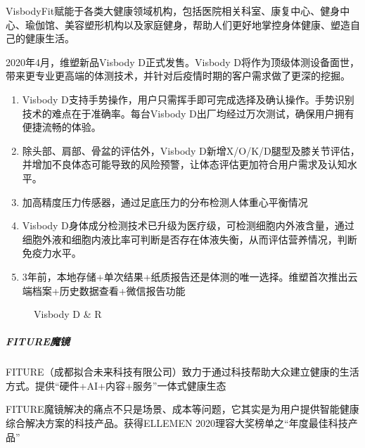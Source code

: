 \documentclass[letterpaper,11pt,english]{sphinxmanual}
\begin{document}
VisbodyFit赋能于各类大健康领域机构，包括医院相关科室、康复中心、健身中心、瑜伽馆、美容塑形机构以及家庭健身，帮助人们更好地掌控身体健康、塑造自己的健康生活。

2020年4月，维塑新品Visbody D正式发售。Visbody
D将作为顶级体测设备面世，带来更专业更高端的体测技术，并针对后疫情时期的客户需求做了更深的挖掘。%
\begin{footnote}[251]\sphinxAtStartFootnote
{}
%
\end{footnote}
\begin{enumerate}
%
\item {} 
Visbody
D支持手势操作，用户只需挥手即可完成选择及确认操作。手势识别技术的难点在于准确率。每台Visbody
D出厂均经过万次测试，确保用户拥有便捷流畅的体验。

\item {} 
除头部、肩部、骨盆的评估外，Visbody
D新增X/O/K/D腿型及膝关节评估，并增加不良体态可能导致的风险预警，让体态评估更加符合用户需求及认知水平。

\item {} 
加高精度压力传感器，通过足底压力的分布检测人体重心平衡情况

\item {} 
Visbody
D身体成分检测技术已升级为医疗级，可检测细胞内外液含量，通过细胞外液和细胞内液比率可判断是否存在体液失衡，从而评估营养情况，判断免疫力水平。

\item {} 
3年前，本地存储+单次结果+纸质报告还是体测的唯一选择。维塑首次推出云端档案+历史数据查看+微信报告功能

\end{enumerate}

\begin{figure}[H]
\centering
\capstart

\noindent{}
\caption{Visbody D \& R}\label{\detokenize{chapter_project/AI_fit:id17}}\end{figure}


\subparagraph{FITURE魔镜}
\label{\detokenize{chapter_project/AI_fit:fiture}}
FITURE（成都拟合未来科技有限公司）致力于通过科技帮助大众建立健康的生活方式。提供“硬件+AI+内容+服务”一体式健康生态

FITURE魔镜解决的痛点不只是场景、成本等问题，它其实是为用户提供智能健康综合解决方案的科技产品。获得ELLEMEN
2020理容大奖榜单之“年度最佳科技产品”
\end{document}
